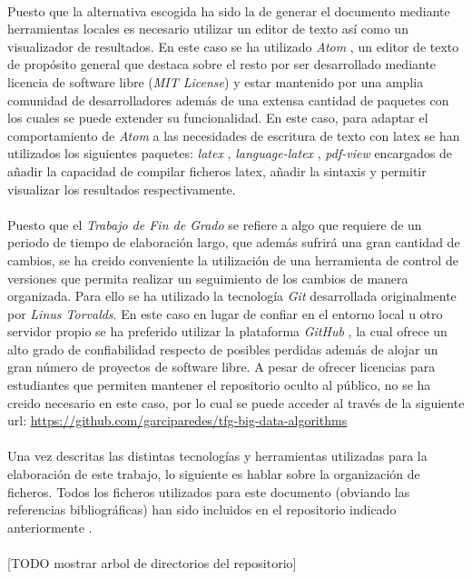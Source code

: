 \documentclass{subfiles}
\begin{document}
    \paragraph{}
    Puesto que la alternativa escogida ha sido la de generar el documento mediante herramientas locales es necesario utilizar un editor de texto así como un visualizador de resultados. En este caso se ha utilizado \emph{Atom} \cite{tool:atom}, un editor de texto de propósito general que destaca sobre el resto por ser desarrollado mediante licencia de software libre (\emph{MIT License}) y estar mantenido por una amplia comunidad de desarrolladores además de una extensa cantidad de paquetes con los cuales se puede extender su funcionalidad. En este caso, para adaptar el comportamiento de \emph{Atom} a las necesidades de escritura de texto con latex se han utilizados los siguientes paquetes: \emph{latex} \cite{tool:atom-latex}, \emph{language-latex} \cite{tool:atom-language-latex}, \emph{pdf-view} \cite{tool:atom-pdf-view} encargados de añadir la capacidad de compilar ficheros latex, añadir la sintaxis y permitir visualizar los resultados respectivamente.

    \paragraph{}
    Puesto que el \emph{Trabajo de Fin de Grado} se refiere a algo que requiere de un periodo de tiempo de elaboración largo, que además sufrirá una gran cantidad de cambios, se ha creido conveniente la utilización de una herramienta de control de versiones que permita realizar un seguimiento de los cambios de manera organizada. Para ello se ha utilizado la tecnología \emph{Git} \cite{tool:git} desarrollada originalmente por \emph{Linus Torvalds}. En este caso en lugar de confiar en el entorno local u otro servidor propio se ha preferido utilizar la plataforma \emph{GitHub} \cite{tool:github}, la cual ofrece un alto grado de confiabilidad respecto de posibles perdidas además de alojar un gran número de proyectos de software libre. A pesar de ofrecer licencias para estudiantes que permiten mantener el repositorio oculto al público, no se ha creido necesario en este caso, por lo cual se puede acceder al través de la siguiente url: \url{https://github.com/garciparedes/tfg-big-data-algorithms} \cite{garciparedes:tfg-big-data-algorithms}

    \paragraph{}
    Una vez descritas las distintas tecnologías y herramientas utilizadas para la elaboración de este trabajo, lo siguiente es hablar sobre la organización de ficheros. Todos los ficheros utilizados para este documento (obviando las referencias bibliográficas) han sido incluidos en el repositorio indicado anteriormente \cite{garciparedes:tfg-big-data-algorithms}.

    \paragraph{}
    [TODO mostrar arbol de directorios del repositorio]
\end{document}
